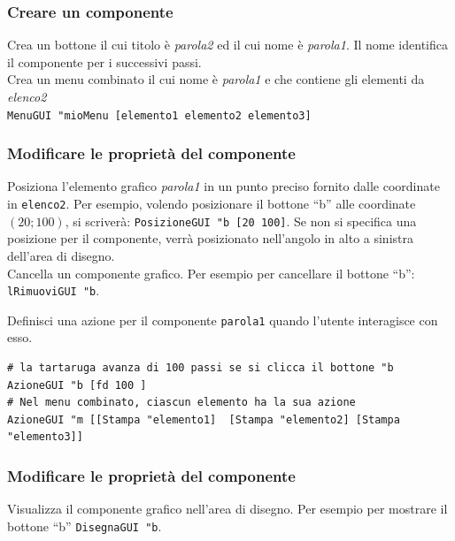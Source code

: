 \subsubsection{Creare un componente}

Crea un bottone il cui titolo è \textit{parola2} ed il cui nome è \textit{parola1}. Il nome identifica il componente per i successivi passi. \\

Crea un menu combinato il cui nome è \textit{parola1} e che contiene gli elementi da \textit{elenco2}\\
\texttt{MenuGUI "mioMenu [elemento1 elemento2 elemento3]}

\subsubsection{Modificare le proprietà del componente} 

Posiziona l'elemento grafico \textit{parola1} in un punto preciso fornito dalle coordinate in \texttt{elenco2}. Per esempio, volendo posizionare il bottone ``b'' alle coordinate $(20;100)$, si scriverà: \lstinline!PosizioneGUI "b [20 100]!. Se non si specifica una posizione per il componente, verrà posizionato nell'angolo in alto a sinistra dell'area di disegno.\\

Cancella un componente grafico. Per esempio per cancellare il bottone ``b'': \lstinline!lRimuoviGUI "b!.

Definisci una azione per il componente \texttt{parola1} quando l'utente interagisce con esso.\\
\begin{lstlisting}[caption="Esempi di \texttt{AzioneGUI}"]
# la tartaruga avanza di 100 passi se si clicca il bottone "b
AzioneGUI "b [fd 100 ]
# Nel menu combinato, ciascun elemento ha la sua azione
AzioneGUI "m [[Stampa "elemento1]  [Stampa "elemento2] [Stampa "elemento3]]
\end{lstlisting}
\noindent


\subsubsection{Modificare le proprietà del componente}
Visualizza il componente grafico nell'area di disegno. Per esempio per mostrare il bottone ``b'' \lstinline!DisegnaGUI "b!.




